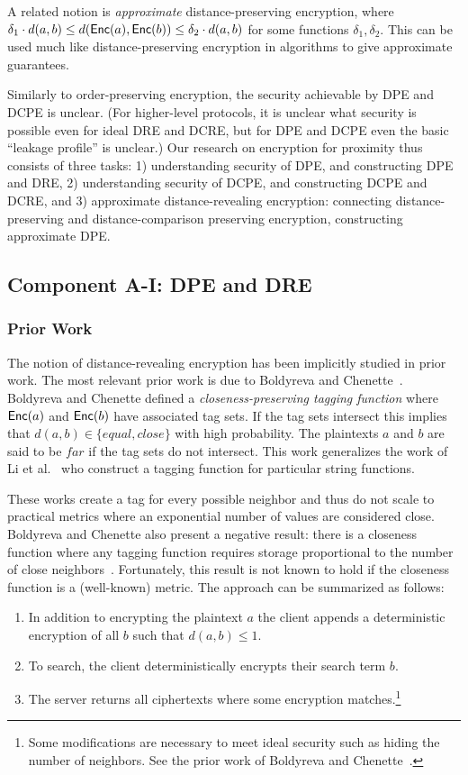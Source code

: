  A related notion is \emph{approximate} distance-preserving encryption, where  $\delta_1 \cdot d(a,b) \leq d(\mathsf{Enc}(a), \mathsf{Enc}(b)) \leq \delta_2  \cdot d(a,b)$ for some functions $\delta_1, \delta_2$.  This can be used much like distance-preserving encryption in algorithms to give approximate guarantees.

Similarly to order-preserving encryption, the security achievable by DPE and DCPE is unclear.  (For higher-level protocols, it is unclear what security is possible even for ideal DRE and DCRE, but for DPE and DCPE even the basic ``leakage profile'' is unclear.)
Our research on encryption for proximity thus consists of three tasks: 1) understanding security of DPE, and constructing DPE and DRE, 2) understanding security of DCPE, and constructing DCPE and DCRE,  and 3) approximate distance-revealing encryption: connecting   distance-preserving and distance-comparison preserving encryption, constructing approximate DPE.

\subsection{Component A-I: DPE and DRE}

\subsubsection{Prior Work}
The notion of distance-revealing encryption has been implicitly studied in prior work.  The most relevant prior work is due to Boldyreva and Chenette~\cite{boldyreva2014efficient}.  Boldyreva and Chenette defined a \emph{closeness-preserving tagging function} where $\mathsf{Enc}(a)$ and $\mathsf{Enc}(b)$ have associated tag sets.  If the tag sets intersect this implies that $d(a,b) \in\{equal, close\}$ with high probability.  The plaintexts $a$ and $b$ are said to be $far$ if the tag sets do not intersect.  This work generalizes the work of Li et al.~\cite{li2010fuzzy,wang2013efficient} who construct a tagging function for particular string functions.  

These works create a tag for every possible neighbor and thus do not scale to practical metrics where an exponential number of values are considered close. Boldyreva and Chenette also present a negative result: there is a closeness function where any tagging function requires storage proportional to the number of close neighbors~\cite[Theorem 5.2]{boldyreva2014efficient}.  Fortunately, this result is not known to hold if the closeness function is a (well-known) metric.  
The approach can be summarized as follows:
\begin{enumerate}
\item In addition to encrypting the plaintext $a$ the client appends a deterministic encryption of all $b$ such that $d(a,b) \le 1$.
\item To search, the client deterministically encrypts their search term $b$.
\item The server returns all ciphertexts where some encryption matches.\footnote{Some  modifications are necessary to meet ideal security such as hiding the number of neighbors.  See the prior work of Boldyreva and Chenette~\cite{boldyreva2014efficient}.}  
\end{enumerate}

